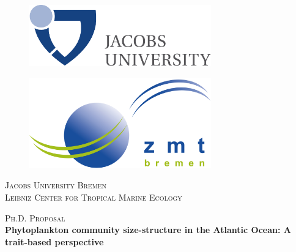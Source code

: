 
\begin{titlepage}
\begin{center}

\begin{figure}[ht]
\begin{minipage}[b]{0.5\linewidth}
\centering
\includegraphics[width=0.7\textwidth]{./0-titel/jacobs_big.pdf}\\
\end{minipage}
\hspace{0.5cm}
\begin{minipage}[b]{0.5\linewidth}
\centering
\includegraphics[width=0.7\textwidth]{./0-titel/zmt_big.png}\\ 
\end{minipage}
\end{figure}

\vspace{1cm}

\textsc{\Large Jacobs University Bremen}\\[1.5cm]

\textsc{\Large Leibniz Center for Tropical Marine Ecology}\\[1.5cm]

\vspace{2cm}

\textsc{\Large Ph.D. Proposal}\\[0.5cm]


{ \Large \bfseries Phytoplankton community size-structure in the Atlantic Ocean: 
A trait-based perspective}\\[0.4cm]


\end{center}
\end{titlepage}
